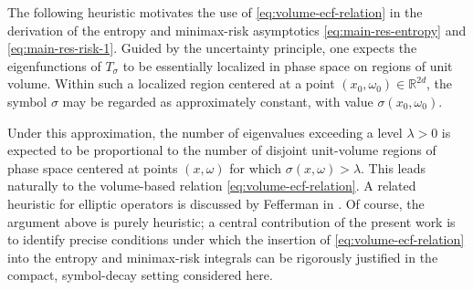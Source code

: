 \documentclass[a4paper,12pt]{article}
\newcommand{\R}{\mathbb{R}}
\newcommand{\hyposymbclassinv}{\mathrm{H}\Gamma^{-m_+,-m_-}_\rho}
\begin{document}




The following heuristic motivates the use of \eqref{eq:volume-ecf-relation} in the
derivation of the entropy and minimax-risk asymptotics
\eqref{eq:main-res-entropy} and \eqref{eq:main-res-risk-1}. Guided by the
uncertainty principle, one expects the eigenfunctions of $T_\sigma$ to be
essentially localized in phase space on regions of unit volume. Within such a
localized region centered at a point $(x_0,\omega_0)\in\R^{2d}$, the symbol
$\sigma$ may be regarded as approximately constant, with value
$\sigma(x_0,\omega_0)$.

Under this approximation, the number of eigenvalues exceeding a level
$\lambda>0$ is expected to be proportional to the number of disjoint unit-volume
regions of phase space centered at points $(x,\omega)$ for which
$\sigma(x,\omega)>\lambda$. This leads naturally to the volume-based relation
\eqref{eq:volume-ecf-relation}. A related heuristic for elliptic operators is
discussed by Fefferman in \cite{fefferman_uncertainty_1983}. Of course, the
argument above is purely heuristic; a central contribution of the present work is
to identify precise conditions under which the insertion of
\eqref{eq:volume-ecf-relation} into the entropy and minimax-risk integrals can be
rigorously justified in the compact, symbol-decay setting considered here.
\end{document}
